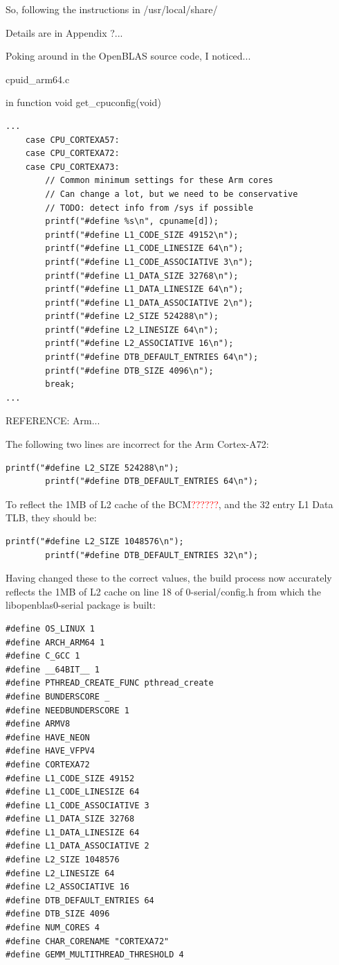 \documentclass{article}
\begin{document}
So, following the instructions in /usr/local/share/

Details are in Appendix ?...

Poking around in the OpenBLAS source code, I noticed...

cpuid\_arm64.c

in function void get\_cpuconfig(void)


\lstset{style=listingstyle}
\begin{lstlisting}[caption=cpuid\_arm64.c, numbers=none]
...
	case CPU_CORTEXA57:
	case CPU_CORTEXA72:
	case CPU_CORTEXA73:
		// Common minimum settings for these Arm cores
		// Can change a lot, but we need to be conservative
		// TODO: detect info from /sys if possible
		printf("#define %s\n", cpuname[d]);
		printf("#define L1_CODE_SIZE 49152\n");
		printf("#define L1_CODE_LINESIZE 64\n");
		printf("#define L1_CODE_ASSOCIATIVE 3\n");
		printf("#define L1_DATA_SIZE 32768\n");
		printf("#define L1_DATA_LINESIZE 64\n");
		printf("#define L1_DATA_ASSOCIATIVE 2\n");
		printf("#define L2_SIZE 524288\n");
		printf("#define L2_LINESIZE 64\n");
		printf("#define L2_ASSOCIATIVE 16\n");
		printf("#define DTB_DEFAULT_ENTRIES 64\n");
		printf("#define DTB_SIZE 4096\n");
		break;
...
\end{lstlisting}

REFERENCE: Arm...

The following two lines are incorrect for the Arm Cortex-A72:

\lstset{style=listingstyle}
\begin{lstlisting}[numbers=none]
		printf("#define L2_SIZE 524288\n");
		printf("#define DTB_DEFAULT_ENTRIES 64\n");
\end{lstlisting}

To reflect the 1MB of L2 cache of the BCM\textcolor{red}{??????}, and the 32 entry L1 Data TLB, they should be:

\lstset{style=listingstyle}
\begin{lstlisting}[numbers=none]
		printf("#define L2_SIZE 1048576\n");
		printf("#define DTB_DEFAULT_ENTRIES 32\n");
\end{lstlisting}


Having changed these to the correct values, the build process now accurately reflects the 1MB of L2 cache on line 18 of 0-serial/config.h from which the libopenblas0-serial package is built:


\lstset{style=listingstyle}
\begin{lstlisting}[caption=0-serial/config.h]
#define OS_LINUX 1
#define ARCH_ARM64 1
#define C_GCC 1
#define __64BIT__ 1
#define PTHREAD_CREATE_FUNC pthread_create
#define BUNDERSCORE _
#define NEEDBUNDERSCORE 1
#define ARMV8
#define HAVE_NEON
#define HAVE_VFPV4
#define CORTEXA72
#define L1_CODE_SIZE 49152
#define L1_CODE_LINESIZE 64
#define L1_CODE_ASSOCIATIVE 3
#define L1_DATA_SIZE 32768
#define L1_DATA_LINESIZE 64
#define L1_DATA_ASSOCIATIVE 2
#define L2_SIZE 1048576
#define L2_LINESIZE 64
#define L2_ASSOCIATIVE 16
#define DTB_DEFAULT_ENTRIES 64
#define DTB_SIZE 4096
#define NUM_CORES 4
#define CHAR_CORENAME "CORTEXA72"
#define GEMM_MULTITHREAD_THRESHOLD 4
\end{lstlisting}
\end{document}
